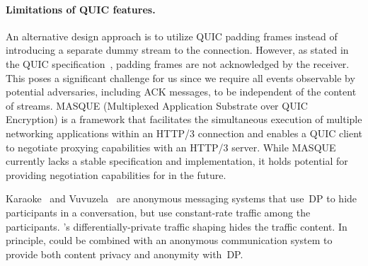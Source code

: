 \paragraph{Limitations of QUIC features.}
An alternative design approach is to utilize QUIC padding frames instead of
introducing a separate dummy stream to the connection. However, as stated in the
QUIC specification~\cite{rfc9000}, padding frames are not acknowledged by the
receiver. This poses a significant challenge for us since we require all events
observable by potential adversaries, including ACK messages, to be independent
of the content of streams.
MASQUE (Multiplexed Application Substrate over QUIC Encryption) is a framework
that facilitates the simultaneous execution of multiple networking applications
within an HTTP/3 connection and enables a QUIC client to negotiate proxying
capabilities with an HTTP/3 server.
While MASQUE currently lacks a stable specification and implementation, it holds
potential for providing negotiation capabilities for {\sys} in the future.
\fi

Karaoke~\cite{lazar2018karaoke} and Vuvuzela~\cite{van2015vuvuzela} are
anonymous messaging systems that use~DP to hide participants in a conversation,
but use constant-rate traffic among the participants.
{\sys}'s differentially-private traffic shaping hides the traffic content. In
principle, {\sys} could be combined with an anonymous communication system to
provide both content privacy and anonymity with~DP.

